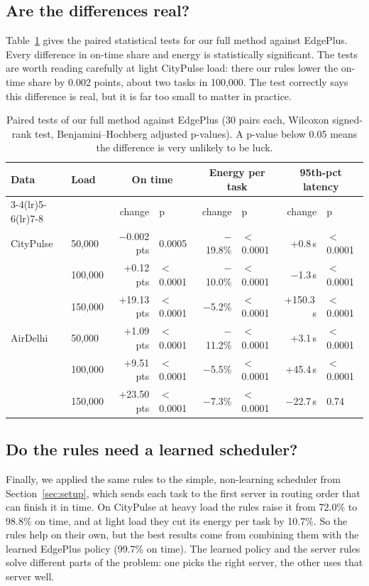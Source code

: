 \documentclass[11pt]{article}
\newcommand{\botrule}{\bottomrule}
\theoremstyle{definition}
\begin{document}
\subsection{Are the differences real?}
Table~\ref{tab:stats} gives the paired statistical tests for our full method against EdgePlus. Every difference
in on-time share and energy is statistically significant. The tests are worth reading carefully at light
CityPulse load: there our rules lower the on-time share by 0.002 points, about two tasks in 100{,}000. The test
correctly says this difference is real, but it is far too small to matter in practice.

\begin{table}[!htbp]
\caption{Paired tests of our full method against EdgePlus (30 pairs each, Wilcoxon signed-rank test,
Benjamini--Hochberg adjusted p-values). A p-value below 0.05 means the difference is very unlikely to be luck.}
\label{tab:stats}
\small
\begin{tabular*}{\textwidth}{@{\extracolsep\fill}llrlrlrl@{}}
\toprule
Data & Load & \multicolumn{2}{c}{On time} & \multicolumn{2}{c}{Energy per task} & \multicolumn{2}{c}{95th-pct latency}\\
\cmidrule(lr){3-4}\cmidrule(lr){5-6}\cmidrule(lr){7-8}
 & & change & p & change & p & change & p\\
\midrule
CityPulse & 50{,}000 & $-$0.002 pts & 0.0005 & $-$19.8\% & $<$0.0001 & +0.8\,s & $<$0.0001\\
 & 100{,}000 & +0.12 pts & $<$0.0001 & $-$10.0\% & $<$0.0001 & $-$1.3\,s & $<$0.0001\\
 & 150{,}000 & +19.13 pts & $<$0.0001 & $-$5.2\% & $<$0.0001 & +150.3\,s & $<$0.0001\\
AirDelhi & 50{,}000 & +1.09 pts & $<$0.0001 & $-$11.2\% & $<$0.0001 & +3.1\,s & $<$0.0001\\
 & 100{,}000 & +9.51 pts & $<$0.0001 & $-$5.5\% & $<$0.0001 & +45.4\,s & $<$0.0001\\
 & 150{,}000 & +23.50 pts & $<$0.0001 & $-$7.3\% & $<$0.0001 & $-$22.7\,s & 0.74\\
\botrule
\end{tabular*}
\end{table}

\subsection{Do the rules need a learned scheduler?}
Finally, we applied the same rules to the simple, non-learning scheduler from Section~\ref{sec:setup}, which sends
each task to the first server in routing order that can finish it in time. On CityPulse at heavy load the rules
raise it from 72.0\% to 98.8\% on time, and at light load they cut its energy per task by 10.7\%. So the rules
help on their own, but the best results come from combining them with the learned EdgePlus policy (99.7\% on
time). The learned policy and the server rules solve different parts of the problem: one picks the right server,
the other uses that server well.
\end{document}

